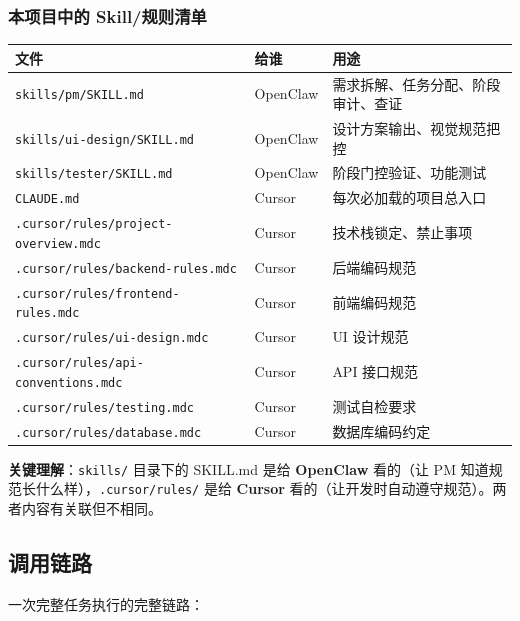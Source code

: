 \documentclass[11pt,a4paper]{article}
\begin{document}
\subsubsection{本项目中的 Skill/规则清单}

\begin{table}[h]
\centering
\begin{tabularx}{\linewidth}{llp{6cm}}
\toprule
\textbf{文件} & \textbf{给谁} & \textbf{用途} \\
\midrule
\texttt{skills/pm/SKILL.md} & OpenClaw & 需求拆解、任务分配、阶段审计、查证 \\
\texttt{skills/ui-design/SKILL.md} & OpenClaw & 设计方案输出、视觉规范把控 \\
\texttt{skills/tester/SKILL.md} & OpenClaw & 阶段门控验证、功能测试 \\
\texttt{CLAUDE.md} & Cursor & 每次必加载的项目总入口 \\
\texttt{.cursor/rules/project-overview.mdc} & Cursor & 技术栈锁定、禁止事项 \\
\texttt{.cursor/rules/backend-rules.mdc} & Cursor & 后端编码规范 \\
\texttt{.cursor/rules/frontend-rules.mdc} & Cursor & 前端编码规范 \\
\texttt{.cursor/rules/ui-design.mdc} & Cursor & UI 设计规范 \\
\texttt{.cursor/rules/api-conventions.mdc} & Cursor & API 接口规范 \\
\texttt{.cursor/rules/testing.mdc} & Cursor & 测试自检要求 \\
\texttt{.cursor/rules/database.mdc} & Cursor & 数据库编码约定 \\
\bottomrule
\end{tabularx}
\end{table}

\textbf{关键理解}：\texttt{skills/} 目录下的 SKILL.md 是给 \textbf{OpenClaw} 看的（让 PM 知道规范长什么样），\texttt{.cursor/rules/} 是给 \textbf{Cursor} 看的（让开发时自动遵守规范）。两者内容有关联但不相同。

\subsection{调用链路}

一次完整任务执行的完整链路：
\end{document}
